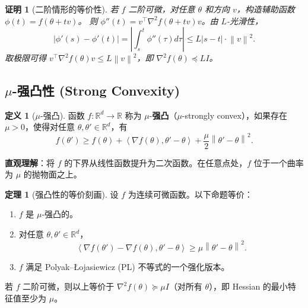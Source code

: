 \documentclass[12pt,a4paper]{ctexart}
\theoremstyle{definition}
\newtheorem{definition}{定义}[section]
\newtheorem{theorem}{定理}[section]
\theoremstyle{plain}
\newtheorem*{proof*}{证明}
\newcommand{\R}{\mathbb{R}}
\newcommand{\grad}{\nabla}
\newcommand{\norm}[1]{\left\lVert #1 \right\rVert}
\newcommand{\ip}[2]{\left\langle #1,#2 \right\rangle}
\begin{document}
\begin{proof*}[二阶情形的等价性]
  若 $f$ 二阶可微，对任意 $\theta$ 和方向 $v$，构造辅助函数 $\phi(t) = f(\theta + tv)$。
  则 $\phi''(t) = v^\top \grad^2 f(\theta + tv) v$。由 $L$-光滑性，
  \begin{equation}
    |\phi'(s) - \phi'(t)| = \left|\int_s^t \phi''(\tau)d\tau\right| \le L|s-t|\cdot \norm{v}^2.
  \end{equation}
  取极限可得 $v^\top \grad^2 f(\theta) v \le L\norm{v}^2$，即 $\grad^2 f(\theta) \preceq L I$。
\end{proof*}

\subsection{$\mu$-强凸性 (Strong Convexity)}

\begin{definition}[$\mu$-强凸]\label{def:strconv}
  函数 $f: \R^d \to \R$ 称为 $\mu$-\textbf{强凸}（$\mu$-strongly convex），如果存在 $\mu > 0$，使得对任意 $\theta, \theta' \in \R^d$，有
  \begin{equation}\label{eq:strconv}
    f(\theta') \ge f(\theta) + \ip{\grad f(\theta)}{\theta' - \theta} + \frac{\mu}{2}\norm{\theta' - \theta}^2.
  \end{equation}
\end{definition}

\textbf{直观理解}：将 $f$ 的下界从线性函数提升为二次函数。在任意点处，$f$ 位于一个曲率为 $\mu$ 的抛物面之上。

\begin{theorem}[强凸性的等价刻画]\label{thm:strconv-equiv}
  设 $f$ 为连续可微函数。以下命题等价：
  \begin{enumerate}[label=(\roman*)]
    \item $f$ 是 $\mu$-强凸的。
    \item 对任意 $\theta, \theta' \in \R^d$，
      \begin{equation}\label{eq:strconv-coco}
        \ip{\grad f(\theta') - \grad f(\theta)}{\theta' - \theta} \ge \mu \norm{\theta' - \theta}^2.
      \end{equation}
    \item $f$ 满足 Polyak--Łojasiewicz (PL) 不等式的一个强化版本。
  \end{enumerate}
  若 $f$ 二阶可微，则以上等价于 $\grad^2 f(\theta) \succeq \mu I$（对所有 $\theta$），即 Hessian 的最小特征值至少为 $\mu$。
\end{theorem}
\end{document}
